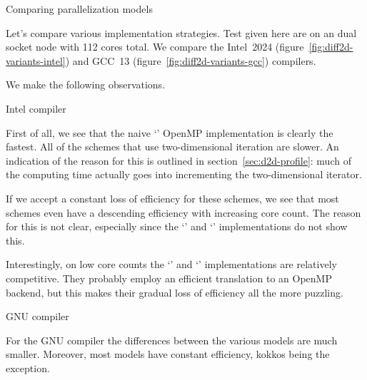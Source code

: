  {Comparing parallelization models}

Let's compare various implementation strategies.
Test given here are on an 
dual socket node with 112 cores total.
We compare the Intel~2024 (figure~\ref{fig:diff2d-variants-intel})
and GCC~13 (figure~\ref{fig:diff2d-variants-gcc})
compilers.

\begin{figure*}[t]
  \begingroup %
  
  
  \endgroup %
  \caption{Comparing implementation strategies, Intel 2024 compiler on a 112-core Sapphire Rapids node.}
  \label{fig:diff2d-variants-intel}
\end{figure*}

\begin{figure*}[t]
  \begingroup %
  
  
  \endgroup %
  \caption{Comparing implementation strategies, Gcc 2024 compiler on a 112-core Sapphire Rapids node.}
  \label{fig:diff2d-variants-gcc}
\end{figure*}

We make the following observations.

 {Intel compiler}

First of all, we see that the naive `' OpenMP implementation
is clearly the fastest.
All of the schemes that use two-dimensional iteration are slower.
An indication of the reason for this is outlined in section~\ref{sec:d2d-profile}:
much of the computing time actually goes into incrementing the
two-dimensional iterator.

If we accept a constant loss of efficiency for these schemes,
we see that most schemes even have a descending efficiency
with increasing core count.
The reason for this is not clear, especially since the
`' and `' implementations do not show this.

Interestingly, on low core counts the `' and `'
implementations are relatively competitive.
They probably employ an efficient translation to an OpenMP backend,
but this makes their gradual loss of efficiency all the more puzzling.

 {GNU compiler}

For the GNU compiler the differences between the various models
are much smaller.
Moreover, most models have constant efficiency, kokkos being the exception.

